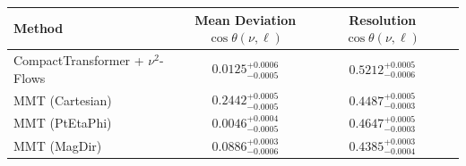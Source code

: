     \begin{tabular}{lccc}
        \toprule
        Method & Mean Deviation $\cos\theta(\nu, \ell)$ & Resolution $\cos\theta(\nu, \ell)$ \\
        \midrule
        CompactTransformer + $\nu^2$-Flows & $0.0125^{+0.0006}_{-0.0005}$ & $0.5212^{+0.0005}_{-0.0006}$ \\
        MMT (Cartesian) & $0.2442^{+0.0005}_{-0.0005}$ & $0.4487^{+0.0005}_{-0.0003}$ \\
        MMT (PtEtaPhi) & $0.0046^{+0.0004}_{-0.0005}$ & $0.4647^{+0.0005}_{-0.0003}$ \\
        MMT (MagDir) & $0.0886^{+0.0003}_{-0.0006}$ & $0.4385^{+0.0003}_{-0.0004}$ \\
        \bottomrule
    \end{tabular}